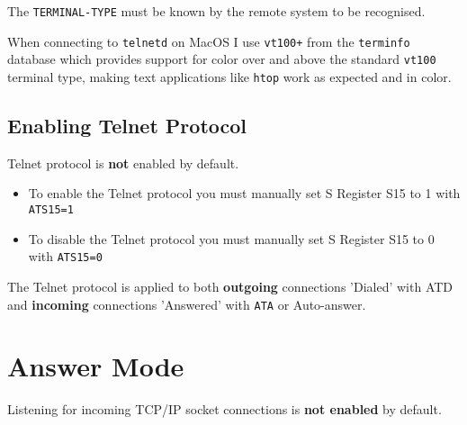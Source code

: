 The \texttt{TERMINAL-TYPE} must be known by the remote system to be recognised.

When connecting to \texttt{telnetd} on MacOS I use \texttt{vt100+} from the \texttt{terminfo} database which provides support for color over and above the standard
\texttt{vt100} terminal type, making text applications like \texttt{htop} work as expected and in color.

\subsection{Enabling Telnet Protocol}

Telnet protocol is \textbf{not} enabled by default.

\begin{itemize}
	\item To enable the Telnet protocol you must manually set S Register S15 to 1 with \texttt{ATS15=1}
	\item To disable the Telnet protocol you must manually set S Register S15 to 0 with \texttt{ATS15=0}
\end{itemize}

The Telnet protocol is applied to both \textbf{outgoing} connections 'Dialed' with ATD and \textbf{incoming} connections 'Answered' with \texttt{ATA} or Auto-answer.


\newpage
\section{Answer Mode}

Listening for incoming TCP/IP socket connections is \textbf{not enabled} by default.

